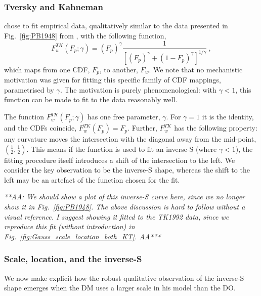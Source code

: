 \documentclass[a4paper, 12pt]{article}
\newcommand{\elabel}[1]{\label{eq:#1}}
\newcommand{\eref}[1]{(Eq.~\ref{eq:#1})}
\newcommand{\fref}[1]{Fig.~\ref{fig:#1}}
\newcommand{\be}{\begin{equation}}
\newcommand{\ee}{\end{equation}}
\renewcommand{\AA}[1]{{\it ***AA: #1 AA***}}
\begin{document}
\subsubsection{Tversky and Kahneman}
\textcite{TverskyKahneman1992} chose to fit empirical data, qualitatively similar to the data presented in \fref{PB1948} from \textcite{PrestonBaratta1948}, with the following function,
%
\be
\elabel{correspondence}
F^{TK}_w\left(F_p; \gamma\right) = \left(F_p\right)^\gamma \frac{1}{\left[\left(F_p\right)^\gamma+\left(1-F_p\right)^\gamma\right]^{1/\gamma}} ~,
\ee
%
which maps from one CDF, $F_p$, to another, $F_w$. We note that no mechanistic motivation was given for fitting this specific family of CDF mappings, parametrised by $\gamma$. The motivation is purely phenomenological: with $\gamma<1$, this function can be made to fit to the data reasonably well.

The function $F^{TK}_w\left(F_p; \gamma \right)$ has one free parameter, $\gamma$. For $\gamma=1$ it is the identity, and the CDFs coincide, $F^{TK}_w\left(F_p\right)=F_p$. Further, $F^{TK}_w$ has the following property: any curvature moves the intersection with the diagonal away from the mid-point, $(\tfrac{1}{2},\tfrac{1}{2})$. This means if the function is used to fit an inverse-S (where $\gamma<1$), the fitting procedure itself introduces a shift of the intersection to the left. We consider the key observation to be the inverse-S shape, whereas the shift to the left may be an artefact of the function chosen for the fit.

\AA{We should show a plot of this inverse-S curve here, since we no longer show it in \fref{PB1948}. The above discussion is hard to follow without a visual reference. I suggest showing it fitted to the TK1992 data, since we reproduce this fit (without introduction) in \fref{Gauss_scale_location_both_KT}.}

\subsubsection{Scale, location, and the inverse-S}
We now make explicit how the robust qualitative observation of the inverse-S shape emerges when the DM uses a larger scale in his model than the DO.
\end{document}
